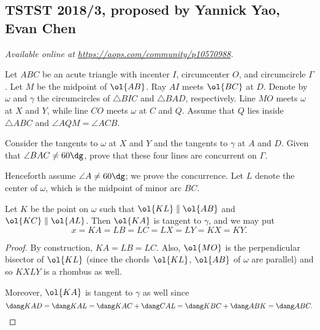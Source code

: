 \documentclass[11pt]{scrartcl}
\begin{document}
\subsection{TSTST 2018/3, proposed by Yannick Yao, Evan Chen}
\textsl{Available online at \url{https://aops.com/community/p10570988}.}
\begin{mdframed}[style=mdpurplebox,frametitle={Problem statement}]
Let $ABC$ be an acute triangle
with incenter $I$, circumcenter $O$, and circumcircle $\Gamma$.
Let $M$ be the midpoint of $\ol{AB}$.
Ray $AI$ meets $\ol{BC}$ at $D$.
Denote by $\omega$ and $\gamma$
the circumcircles of $\triangle BIC$ and $\triangle BAD$, respectively.
Line $MO$ meets $\omega$ at $X$ and $Y$,
while line $CO$ meets $\omega$ at $C$ and $Q$.
Assume that $Q$ lies inside $\triangle ABC$
and $\angle AQM = \angle ACB$.

Consider the tangents to $\omega$ at $X$ and $Y$
and the tangents to $\gamma$ at $A$ and $D$.
Given that $\angle BAC \neq 60\dg$,
prove that these four lines are concurrent on $\Gamma$.
\end{mdframed}
Henceforth assume $\angle A \neq 60\dg$; we prove the concurrence.
Let $L$ denote the center of $\omega$,
which is the midpoint of minor arc $BC$.

\begin{claim*}
  Let $K$ be the point on $\omega$ such that
  $\ol{KL} \parallel \ol{AB}$ and $\ol{KC} \parallel \ol{AL}$.
  Then $\ol{KA}$ is tangent to $\gamma$,
  and we may put
  \[ x = KA = LB = LC = LX = LY = KX = KY. \]
\end{claim*}
\begin{proof}
  By construction, $KA = LB = LC$.
  Also, $\ol{MO}$ is the perpendicular bisector of $\ol{KL}$
  (since the chords $\ol{KL}$, $\ol{AB}$ of $\omega$ are parallel)
  and so $KXLY$ is a rhombus as well.

  Moreover, $\ol{KA}$ is tangent to $\gamma$ as well since
  \[ \dang KAD = \dang KAL = \dang KAC + \dang CAL
    = \dang KBC + \dang ABK = \dang ABC. \qedhere \]
\end{proof}
\end{document}
